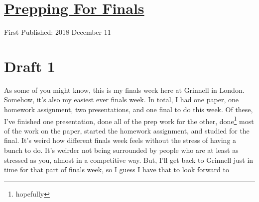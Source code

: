 \documentclass[12pt]{article}[titlepage]
\newcommand{\1}{\={a}}
\newcommand{\2}{\={e}}
\newcommand{\3}{\={\i}}
\newcommand{\4}{\=o}
\newcommand{\5}{\=u}
\newcommand{\6}{\={A}}
\renewcommand{\,}{\textsuperscript{,}}
\begin{document}
\doublespacing
\section{\href{prepping-for-finals-2018.html}{Prepping For Finals}}
First Published: 2018 December 11
\section{Draft 1}
As some of you might know, this is my finals week here at Grinnell in London.
Somehow, it's also my easiest ever finals week.
In total, I had one paper, one homework assignment, two presentations, and one final to do this week.
Of these, I've finished one presentation, done all of the prep work for the other, done\footnote{hopefully} most of the work on the paper, started the homework assignment, and studied for the final.
It's weird how different finals week feels without the stress of having a bunch to do.
It's weirder not being surrounded by people who are at least as stressed as you, almost in a competitive way.
But, I'll get back to Grinnell just in time for that part of finals week, so I guess I have that to look forward to
\end{document}
